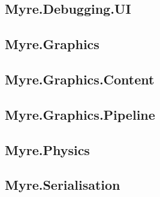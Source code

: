 \documentclass{article}
\begin{document}
\subsection{Myre.Debugging.UI}
\subsection{Myre.Graphics}
\subsection{Myre.Graphics.Content}
\subsection{Myre.Graphics.Pipeline}
\subsection{Myre.Physics}
\subsection{Myre.Serialisation}
\end{document}
